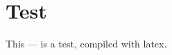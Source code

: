 \documentclass{article}
\begin{document}
\section{Test}
This --- is a test, compiled with latex.\\
\end{document}
